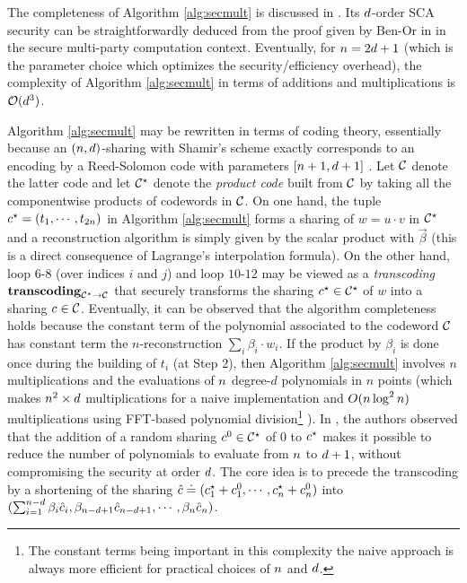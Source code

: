 \documentclass{llncs}
\begin{document}
The completeness of Algorithm \ref{alg:secmult} is discussed in \cite{BGW88}. Its $d$\myth-order SCA security can be straightforwardly deduced from the proof given by Ben-Or \etal in \cite{BGW88} in the secure multi-party computation context. Eventually, for $n=2d+1$ (which is the parameter choice which optimizes the security/efficiency overhead), the complexity of Algorithm \ref{alg:secmult} in terms of additions and multiplications is ${\cal O}(d^3)$.

Algorithm \ref{alg:secmult} may be rewritten in terms of coding theory, essentially because an $(n,d)$-sharing with Shamir's scheme exactly corresponds to an encoding by a Reed-Solomon code with parameters $[n+1,d+1]$ \cite{MS81}. Let $\mathcal{C}$ denote the latter code and let $\mathcal{C}^{\star}$ denote the {\em product code} built from $\mathcal{C}$ by taking all the componentwise products of codewords in $\mathcal{C}$. On one hand, the tuple $c^{\star} = (t_1,\cdots,t_{2n})$ in Algorithm \ref{alg:secmult} forms a sharing of $w=u\cdot v$ in $\mathcal{C}^{\star}$ and a reconstruction algorithm is simply given by the scalar product with $\vec \beta$ (this is a direct consequence of Lagrange's interpolation formula). On the other hand, loop $6$-$8$ (over indices $i$ and $j$) and loop $10$-$12$ may be viewed as a {\em transcoding} $\mathrm{\bf transcoding}_{\mathcal{C}^{\star} \rightarrow \mathcal{C}}$ that securely transforms the sharing $c^{\star}\in \mathcal{C}^{\star}$ of $w$  into a sharing $c \in \mathcal{C}$. Eventually, it can be observed that the algorithm completeness holds because the constant term of the polynomial associated to the codeword $\mathcal{C}$ has constant term the $n$-reconstruction $\sum_i \beta_i\cdot w_i$. If the product by $\beta_i$ is done once during the building of $t_i$ (at Step $2$), then Algorithm \ref{alg:secmult} involves $n$ multiplications and the evaluations of $n$ degree-$d$ polynomials in $n$ points (which makes $n^2\times d$ multiplications for a naive implementation and $O(n \log^2 n)$ multiplications using FFT-based polynomial division\footnote{The constant terms being important in this complexity the naive approach is always more efficient for practical choices of $n$ and $d$.} \cite{CPR12}). In \cite{CRZ13}, the authors observed that the addition of a random sharing $c^{0}\in \mathcal{C}^{\star}$ of $0$ to $c^{\star}$ makes it possible to reduce the number of polynomials to evaluate from $n$ to $d+1$, without compromising the security at order $d$. The core idea is to precede the transcoding by a shortening of the sharing $\hat{c} \doteq (c^{\star}_1 + c^{0}_1,\cdots,c^{\star}_{n} + c^{0}_{n} )$ into $(\sum_{i=1}^{n - d}\beta_i \hat{c}_i,\beta_{n -d+1}\hat{c}_{n -d+1},\cdots,\beta_{n}\hat{c}_{n})$.
\end{document}
